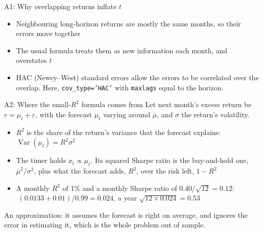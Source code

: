 \documentclass[aspectratio=169,10pt]{beamer}
\begin{document}
\begin{frame}[label=appendix_hac]{A1: Why overlapping returns inflate $t$}
\begin{center}
\end{center}
\vskip 6pt
\begin{itemize}
\item Neighbouring long-horizon returns are mostly the same months, so their errors move together
\vskip 4pt
\item The usual formula treats them as new information each month, and overstates $t$
\vskip 4pt
\item HAC (Newey--West) standard errors allow the errors to be correlated over the overlap. Here, \texttt{cov\_type='HAC'} with \texttt{maxlags} equal to the horizon.
\end{itemize}
\hfill \hyperlink{reg}{}
\end{frame}

\begin{frame}[label=appendix_ct]{A2: Where the small-$R^{2}$ formula comes from}
Let next month's excess return be $r = \mu_{t} + \varepsilon$, with the forecast $\mu_{t}$ varying around $\bar\mu$, and $\sigma$ the return's volatility.
\vskip 6pt
\begin{itemize}
\item $R^{2}$ is the share of the return's variance that the forecast explains: $\operatorname{Var}(\mu_{t}) = R^{2}\sigma^{2}$
\vskip 4pt
\item The timer holds $x_{t} \propto \mu_{t}$. Its squared Sharpe ratio is the buy-and-hold one, $\bar\mu^{2}/\sigma^{2}$, plus what the forecast adds, $R^{2}$, over the risk left, $1 - R^{2}$
\vskip 4pt
\item A monthly $R^{2}$ of 1\% and a monthly Sharpe ratio of $0.40/\sqrt{12} = 0.12$: $\;(0.0133 + 0.01)/0.99 = 0.024$, a year $\sqrt{12 \times 0.024} = 0.53$
\end{itemize}
\vskip 6pt
{\small An approximation: it assumes the forecast is right on average, and ignores the error in estimating it, which is the whole problem out of sample.}
\hfill \hyperlink{ct}{}
\end{frame}
\end{document}
